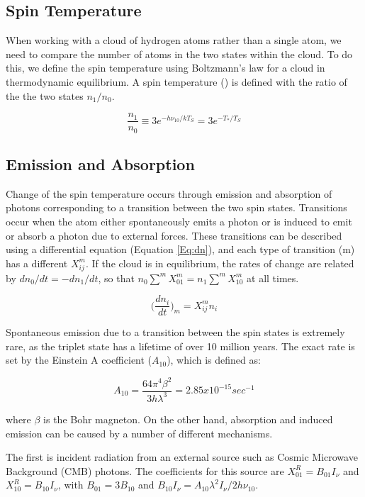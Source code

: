 \subsection{Spin Temperature}
When working with a cloud of hydrogen atoms rather than a single atom, we need to compare the number of atoms in the two states within the cloud. To do this, we define the spin temperature using Boltzmann's law for a cloud in thermodynamic equilibrium. A spin temperature (\ts) is defined with the ratio of the the two states $n_1/n_0$. 

\begin{equation}\label{Eq:T_s}
\frac{n_1}{n_0} \equiv 3 e^{- h \nu_{10} / kT_S} = 3 e^{-T_*/T_S}
\end{equation} 

\subsection{Emission and Absorption} \label{Sec:dT_S}
Change of the spin temperature occurs through emission and absorption of \cm photons corresponding to a transition between the two spin states. Transitions occur when the atom either spontaneously emits a photon or is induced to emit or absorb a photon due to external forces. These transitions can be described using a differential equation (Equation \ref{Eq:dn}), and each type of transition (m) has a different $X^m_{ij}$. If the cloud is in equilibrium, the rates of change are related by $d n_0/dt = - d n_1 /dt$, so that $n_0 \sum^m X^m_{01} = n_1 \sum^m X^m_{10}$ at all times. 

\begin{equation} \label{Eq:dn}
\big( \frac{d n_i}{dt} \big)_m = X^m_{ij} n_i
\end{equation}

Spontaneous emission due to a transition between the spin states is extremely rare, as the triplet state has a lifetime of over 10 million years. The exact rate is set by the Einstein A coefficient ($A_{10}$), which is defined as: 

\begin{equation}
A_{10} = \frac{64 \pi^4 \beta^2}{3 h \lambda^3} = 2.85 x 10^{-15} sec^{-1}
\end{equation}

where $\beta$ is the Bohr magneton. On the other hand, absorption and induced emission can be caused by a number of different mechanisms. 

The first is incident radiation from an external source such as Cosmic Microwave Background (CMB) photons. The coefficients for this source are $X^R_{01} = B_{01} I_\nu$ and $X^R_{10} = B_{10} I_\nu $, with $B_{01} = 3 B_{10}$ and $B_{10} I_{\nu} = A_{10} \lambda^2 I_\nu / 2 h \nu_{10}$. 

